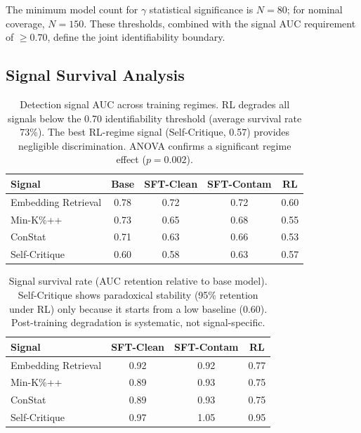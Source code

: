 \documentclass[letterpaper, 10pt, twocolumn]{article}
\begin{document}
The minimum model count for $\gamma$ statistical significance is $N = 80$; for nominal coverage, $N = 150$.
These thresholds, combined with the signal AUC requirement of $\geq 0.70$, define the joint identifiability boundary.

\subsection{Signal Survival Analysis}
\label{sec:survival}

\begin{table}[t]
\centering
\caption{Detection signal AUC across training regimes. RL degrades all signals below the 0.70 identifiability threshold (average survival rate 73\%). The best RL-regime signal (Self-Critique, 0.57) provides negligible discrimination. ANOVA confirms a significant regime effect ($p = 0.002$).}
\label{tab:signal_survival}
\small
\begin{tabular}{lcccc}
\toprule
Signal & Base & SFT-Clean & SFT-Contam & RL \\
\midrule
Embedding Retrieval & 0.78 & 0.72 & 0.72 & 0.60 \\
Min-K\%++ & 0.73 & 0.65 & 0.68 & 0.55 \\
ConStat & 0.71 & 0.63 & 0.66 & 0.53 \\
Self-Critique & 0.60 & 0.58 & 0.63 & 0.57 \\
\bottomrule
\end{tabular}
\end{table}

\begin{table}[t]
\centering
\caption{Signal survival rate (AUC retention relative to base model). Self-Critique shows paradoxical stability (95\% retention under RL) only because it starts from a low baseline (0.60). Post-training degradation is systematic, not signal-specific.}
\label{tab:survival_rate}
\small
\begin{tabular}{lccc}
\toprule
Signal & SFT-Clean & SFT-Contam & RL \\
\midrule
Embedding Retrieval & 0.92 & 0.92 & 0.77 \\
Min-K\%++ & 0.89 & 0.93 & 0.75 \\
ConStat & 0.89 & 0.93 & 0.75 \\
Self-Critique & 0.97 & 1.05 & 0.95 \\
\bottomrule
\end{tabular}
\end{table}
\end{document}
